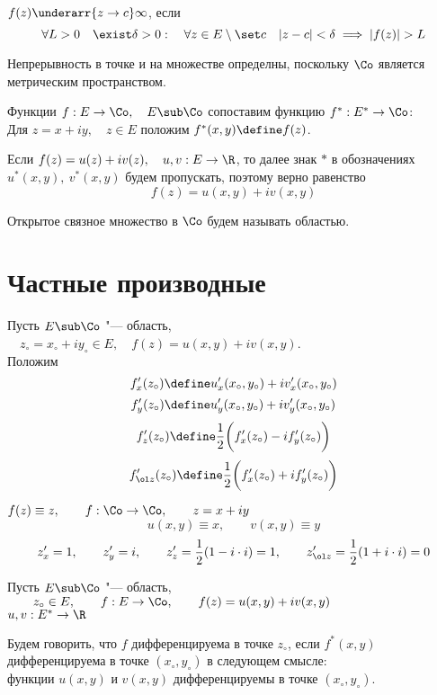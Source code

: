 \begin{definition}
	$ f(z) \underarr{z \to c} \infty $, если
	$$ \forall L > 0 \quad \exist \delta > 0 : \quad \forall z \in E \setminus \set c \quad |z - c| < \delta \implies |f(z)| > L $$
\end{definition}

Непрерывность в точке и на множестве определны, поскольку $ \Co $ является метрическим пространством.

Функции $ f : E \to \Co, \quad E \sub \Co $ сопоставим функцию $ f^* : E^* \to \Co $: \\
Для $ z = x + iy, \quad z \in E $ положим $ f^*(x, y) \define f(z) $.

Если $ f(z) = u(z) + iv(z), \quad u, v : E \to \R $, то далее знак $ * $ в обозначениях $ u^*(x, y), ~ v^*(x, y) $ будем пропускать, поэтому верно равенство
$$ f(z) = u(x, y) + iv(x, y) $$

\begin{definition}
	Открытое связное множество в $ \Co $ будем называть областью.
\end{definition}

\section{Частные производные}

Пусть $ E \sub \Co $ "--- область, $ \quad z_\circ = x_\circ + iy_\circ \in E, \quad f(z) = u(x, y) + iv(x, y) $. \\
Положим
$$ f_x'(z_\circ) \define u_x'(x_\circ, y_\circ) + iv_x'(x_\circ, y_\circ) $$
$$ f_y'(z_\circ) \define u_y'(x_\circ, y_\circ) + iv_y'(x_\circ, y_\circ) $$
$$ f_z'(z_\circ) \define \frac12 \bigg( f_x'(z_\circ) - if_y'(z_\circ) \bigg) $$
$$ f_{\ol z}'(z_\circ) \define \frac12 \bigg( f_x'(z_\circ) + if_y'(z_\circ) \bigg) $$

\begin{eg}
	$ f(z) \equiv z, \qquad f : \Co \to \Co, \qquad z = x + iy $
	$$ u(x, y) \equiv x, \qquad v(x, y) \equiv y $$
	$$ z_x' = 1, \qquad z_y' = i, \qquad z_z' = \frac12(1 - i \cdot i) = 1, \qquad z_{\ol z}' = \frac12(1 + i \cdot i) = 0 $$
\end{eg}

\begin{definition}
	Пусть $ E \sub \Co $ "--- область, $ \qquad z_\circ \in E, \qquad f : E \to \Co, \qquad f(z) = u(x, y) + iv(x, y) $ \\
	$ u, v : E^* \to \R $

	Будем говорить, что $ f $ дифференцируема в точке $ z_\circ $, если $ f^*(x, y) $ дифференцируема в точке $ (x_\circ, y_\circ) $ в следующем смысле: \\
	функции $ u(x, y) $ и $ v(x, y) $ дифференцируемы в точке $ (x_\circ, y_\circ) $.
\end{definition}

